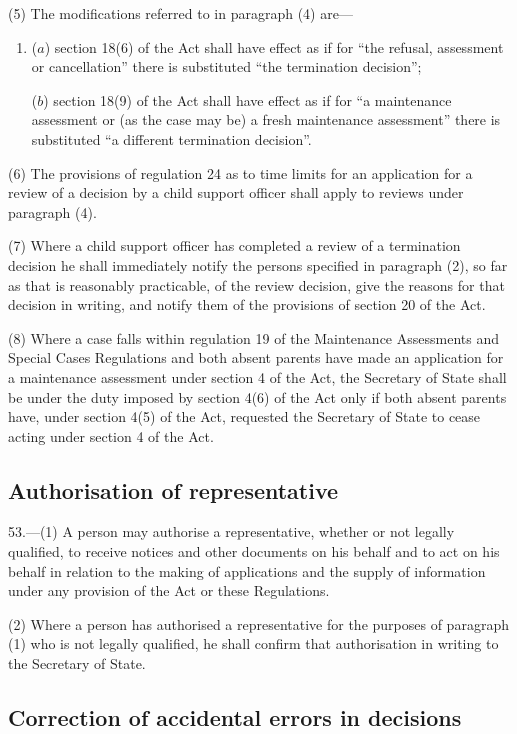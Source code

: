 \documentclass[a4paper]{article}
\begin{document}
(5) The modifications referred to in paragraph (4) are—
\begin{enumerate}\item[]
($a$) section 18(6) of the Act shall have effect as if for “the refusal, assessment or cancellation” there is substituted “the termination decision”;

($b$) section 18(9) of the Act shall have effect as if for “a maintenance assessment or (as the case may be) a fresh maintenance assessment” there is substituted “a different termination decision”.
\end{enumerate}

(6) The provisions of regulation 24 as to time limits for an application for a review of a decision by a child support officer shall apply to reviews under paragraph (4).

(7) Where a child support officer has completed a review of a termination decision he shall immediately notify the persons specified in paragraph (2), so far as that is reasonably practicable, of the review decision, give the reasons for that decision in writing, and notify them of the provisions of section 20 of the Act.

(8) Where a case falls within regulation 19 of the Maintenance Assessments and Special Cases Regulations and both absent parents have made an application for a maintenance assessment under section 4 of the Act, the Secretary of State shall be under the duty imposed by section 4(6) of the Act only if both absent parents have, under section 4(5) of the Act, requested the Secretary of State to cease acting under section 4 of the Act.

\subsection[53. Authorisation of representative]{Authorisation of representative}

53.—(1) A person may authorise a representative, whether or not legally qualified, to receive notices and other documents on his behalf and to act on his behalf in relation to the making of applications and the supply of information under any provision of the Act or these Regulations.

(2) Where a person has authorised a representative for the purposes of paragraph (1) who is not legally qualified, he shall confirm that authorisation in writing to the Secretary of State.

\subsection[54. Correction of accidental errors in decisions]{Correction of accidental errors in decisions}
\end{document}
